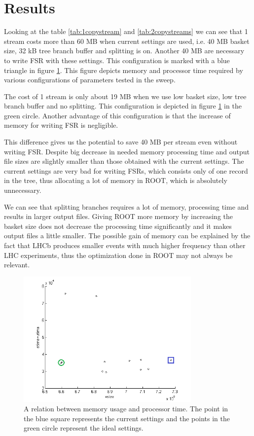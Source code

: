 \documentclass[pdftex,a4paper]{article}
\begin{document}
\section{Results}
\label{sec:findings}
Looking at the table \ref{tab:1copystream} and \ref{tab:2copystreams} we can see that 1 stream costs more than 60 MB when current settings are used, i.e. 40 MB basket size, 32 kB tree branch buffer and splitting is on. Another 40 MB are necessary to write FSR with these settings. This configuration is marked with a blue triangle in figure \ref{fig:vsizeXcpu}. This figure depicts memory and processor time required by various configurations of parameters tested in the sweep.

The cost of 1 stream is only about 19 MB when we use low basket size, low tree branch buffer and no splitting. This configuration is depicted in figure  \ref{fig:vsizeXcpu} in the green circle. Another advantage of this configuration is that the increase of memory for writing FSR is negligible.

This difference gives us the potential to save 40 MB per stream even without writing FSR. Despite big decrease in needed memory processing time and output file sizes are slightly smaller than those obtained with the current settings. The current settings are very bad for writing FSRs, which consists only of one record in the tree, thus allocating a lot of memory in ROOT, which is absolutely unnecessary.

We can see that splitting branches requires a lot of memory, processing time and results in larger output files. Giving ROOT more memory by increasing the basket size does not decrease the processing time significantly and it makes output files a little smaller. The possible gain of memory can be explained by the fact that LHCb produces smaller events with much higher frequency than other LHC experiments, thus the optimization done in ROOT may not always be relevant.

\begin{figure}[hb]
  \label{fig:vsizeXcpu}
  \begin{center}
  \includegraphics[width=0.8\textwidth]{Ivan_Valencik_RootCnv_opt_vsizeXcpu.png}
  \caption{\small{A relation between memory usage and processor time. The point in the blue square represents the current settings and the points in the green circle represent the ideal settings.}}
\end{center}
\end{figure}
\end{document}
